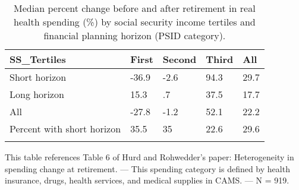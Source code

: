 \begin{table}[tbp] \centering
{}

\caption{Median percent change before and after retirement in real health spending (\%) by social security income tertiles and financial planning horizon (PSID category).}
\begin{tabularx}{\textwidth}{lCCCC}

\toprule
{SS\_Tertiles}&{First}&{Second}&{Third}&{All} \tabularnewline
\midrule\addlinespace[1.5ex]
Short horizon&-36.9&-2.6&94.3&29.7 \tabularnewline
Long horizon&15.3&.7&37.5&17.7 \tabularnewline
All&-27.8&-1.2&52.1&22.2 \tabularnewline
Percent with short horizon&35.5&35&22.6&29.6 \tabularnewline
\bottomrule \addlinespace[1.5ex]

\end{tabularx}
\begin{flushleft}
\footnotesize This table references Table 6 of Hurd and Rohwedder's paper: Heterogeneity in spending change at retirement. \linebreak --- \linebreak This spending category is defined by health insurance, drugs, health services, and medical supplies in CAMS. \linebreak --- \linebreak N = 919.
\end{flushleft}
\end{table}
